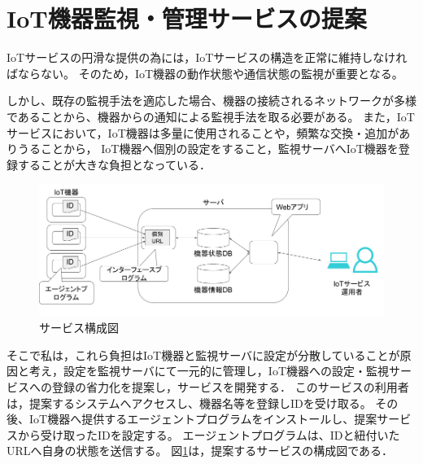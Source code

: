 \section{IoT機器監視・管理サービスの提案}
IoTサービスの円滑な提供の為には，IoTサービスの構造を正常に維持しなければならない。
そのため，IoT機器の動作状態や通信状態の監視が重要となる。

しかし、既存の監視手法を適応した場合、機器の接続されるネットワークが多様であることから、機器からの通知による監視手法を取る必要がある。
また，IoTサービスにおいて，IoT機器は多量に使用されることや，頻繁な交換・追加がありうることから，
IoT機器へ個別の設定をすること，監視サーバへIoT機器を登録することが大きな負担となっている．
\medskip

\begin{figure}[htbp]
\includegraphics[width=16cm]{images/prop_diag.png}
\caption{サービス構成図}
\label{fig:prop_diag}
\end{figure}
そこで私は，これら負担はIoT機器と監視サーバに設定が分散していることが原因と考え，設定を監視サーバにて一元的に管理し，IoT機器への設定・監視サービスへの登録の省力化を提案し，サービスを開発する．
このサービスの利用者は，提案するシステムへアクセスし、機器名等を登録しIDを受け取る。
その後、IoT機器へ提供するエージェントプログラムをインストールし、提案サービスから受け取ったIDを設定する。
エージェントプログラムは、IDと紐付いたURLへ自身の状態を送信する。
図\ref{fig:prop_diag}は，提案するサービスの構成図である．
\newpage

